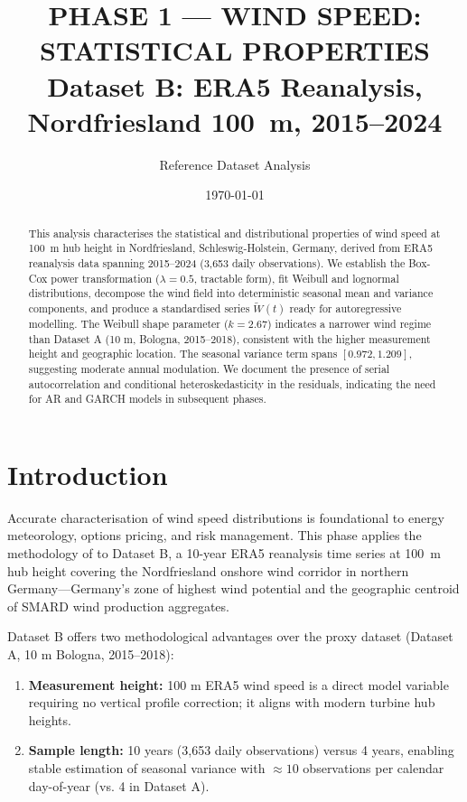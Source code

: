 \documentclass[11pt]{article}
\title{\textbf{PHASE 1 — WIND SPEED: STATISTICAL PROPERTIES}\\
Dataset B: ERA5 Reanalysis, Nordfriesland 100~m, 2015--2024}
\author{Reference Dataset Analysis}
\date{\today}
\begin{document}
\maketitle

\begin{abstract}
\noindent
This analysis characterises the statistical and distributional properties of wind speed at 100~m hub height in Nordfriesland, Schleswig-Holstein, Germany, derived from ERA5 reanalysis data spanning 2015--2024 (3,653 daily observations). We establish the Box-Cox power transformation ($\lambda = 0.5$, tractable form), fit Weibull and lognormal distributions, decompose the wind field into deterministic seasonal mean and variance components, and produce a standardised series $\widetilde{W}(t)$ ready for autoregressive modelling. The Weibull shape parameter ($k = 2.67$) indicates a narrower wind regime than Dataset A (10 m, Bologna, 2015--2018), consistent with the higher measurement height and geographic location. The seasonal variance term spans $[0.972, 1.209]$, suggesting moderate annual modulation. We document the presence of serial autocorrelation and conditional heteroskedasticity in the residuals, indicating the need for AR and GARCH models in subsequent phases.
\end{abstract}

\section{Introduction}

Accurate characterisation of wind speed distributions is foundational to energy meteorology, options pricing, and risk management. This phase applies the methodology of \citet{SaltyteBenth2009} to Dataset B, a 10-year ERA5 reanalysis time series at 100~m hub height covering the Nordfriesland onshore wind corridor in northern Germany---Germany's zone of highest wind potential and the geographic centroid of SMARD wind production aggregates.

Dataset B offers two methodological advantages over the proxy dataset (Dataset A, 10 m Bologna, 2015--2018):
\begin{enumerate}
  \item \textbf{Measurement height:} 100 m ERA5 wind speed is a direct model variable requiring no vertical profile correction; it aligns with modern turbine hub heights.
  \item \textbf{Sample length:} 10 years (3,653 daily observations) versus 4 years, enabling stable estimation of seasonal variance with $\approx 10$ observations per calendar day-of-year (vs. 4 in Dataset A).
\end{enumerate}
\end{document}
